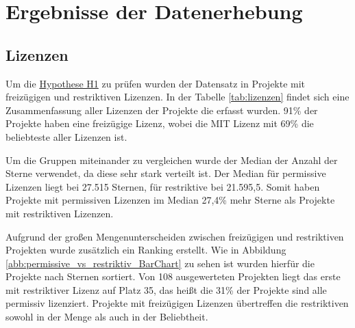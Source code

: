 \newpage %
\chapter{Ergebnisse der Datenerhebung}



\section{Lizenzen} \label{sec:Ergebnisse_Datenerhebung_Lizenzen}


\bigskip
\noindent
Um die \hyperref[H:1]{Hypothese H1} zu prüfen wurden der Datensatz in Projekte mit freizügigen und
restriktiven
Lizenzen. 
In der Tabelle \ref{tab:lizenzen} findet sich eine Zusammenfassung aller Lizenzen der
Projekte die erfasst wurden. 91\% der Projekte haben eine freizügige Lizenz, wobei die MIT Lizenz mit 69\%
die beliebteste aller Lizenzen ist.

Um die Gruppen miteinander zu vergleichen wurde der Median der Anzahl der Sterne verwendet, da diese
sehr stark verteilt ist. Der Median für permissive Lizenzen liegt bei 27.515 Sternen, für
restriktive bei 21.595,5. Somit haben Projekte mit permissiven Lizenzen im Median 27,4\% mehr Sterne
als Projekte mit restriktiven Lizenzen.

Aufgrund der großen Mengenunterscheiden zwischen freizügigen und restriktiven Projekten wurde
zusätzlich ein Ranking erstellt. Wie in Abbildung \ref{abb:permissive_vs_restriktiv_BarChart} zu sehen
ist wurden hierfür die Projekte nach Sternen sortiert. Von 108 ausgewerteten Projekten liegt das erste
mit restriktiver Lizenz auf Platz 35, das heißt die  31\% der Projekte sind alle 
permissiv lizenziert. Projekte mit freizügigen Lizenzen übertreffen die restriktiven sowohl in der Menge 
als auch in der Beliebtheit.
 







